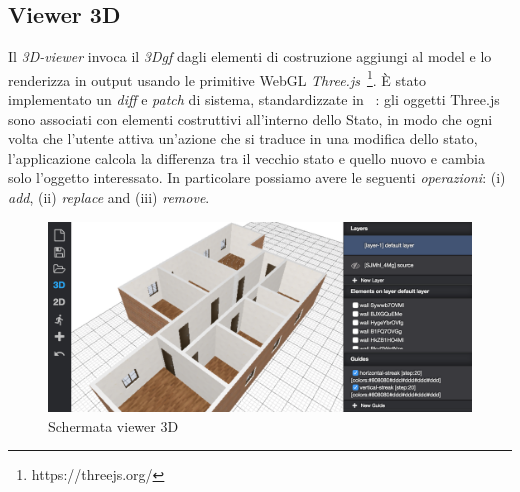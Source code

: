 \subsection{Viewer 3D}
Il \emph{3D-viewer} invoca il \emph{3Dgf} dagli elementi di costruzione aggiungi al model e lo renderizza in output usando le primitive WebGL
\emph{Three.js}~\footnote{https://threejs.org/}. \`E stato implementato un \emph{diff} e \emph{patch} di
sistema, standardizzate in ~\cite{rfc6902}: gli oggetti Three.js sono associati con elementi costruttivi all'interno dello Stato,
in modo che ogni volta che l'utente attiva un'azione che si traduce in una modifica dello stato, l'applicazione calcola
la differenza tra il vecchio stato e quello nuovo e cambia solo l'oggetto interessato. In particolare possiamo avere le seguenti \textit{operazioni}:
(i) \emph{add}, (ii) \emph{replace} and (iii) \emph{remove}.\\

\begin{figure}[htbp] %
   \centering
   \includegraphics[width=1\linewidth]{images/3d}
   \caption{Schermata viewer 3D }
   \label{fig:viewer3D}
\end{figure}
\newpage

